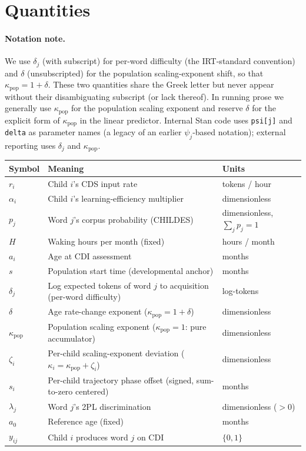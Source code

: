 \documentclass[11pt]{article}
\begin{document}
\section{Quantities}

\paragraph{Notation note.} We use \(\delta_j\) (with subscript) for
per-word difficulty (the IRT-standard convention) and \(\delta\)
(unsubscripted) for the population scaling-exponent shift, so that
\(\kappa_{\text{pop}} = 1 + \delta\). These two quantities share the
Greek letter but never appear without their disambiguating subscript
(or lack thereof). In running prose we generally use
\(\kappa_{\text{pop}}\) for the population scaling exponent and reserve
\(\delta\) for the explicit form of \(\kappa_{\text{pop}}\) in the
linear predictor. Internal Stan code uses \texttt{psi[j]} and
\texttt{delta} as parameter names (a legacy of an earlier
\(\psi_j\)-based notation); external reporting uses \(\delta_j\) and
\(\kappa_{\text{pop}}\).

\begin{center}
\small
\begin{tabular}{@{}lll@{}}
\toprule
Symbol & Meaning & Units \\
\midrule
\(r_i\)         & Child \(i\)'s CDS input rate                & tokens / hour \\
\(\alpha_i\)    & Child \(i\)'s learning-efficiency multiplier & dimensionless \\
\(p_j\)         & Word \(j\)'s corpus probability (CHILDES)   & dimensionless, \(\sum_j p_j = 1\) \\
\(H\)           & Waking hours per month (fixed)              & hours / month \\
\(a_i\)         & Age at CDI assessment                       & months \\
\(s\)           & Population start time (developmental anchor) & months \\
\(\delta_j\)    & Log expected tokens of word \(j\) to acquisition (per-word difficulty) & log-tokens \\
\(\delta\)      & Age rate-change exponent (\(\kappa_{\text{pop}} = 1 + \delta\)) & dimensionless \\
\(\kappa_{\text{pop}}\) & Population scaling exponent (\(\kappa_{\text{pop}} = 1\): pure accumulator) & dimensionless \\
\(\zeta_i\)     & Per-child scaling-exponent deviation (\(\kappa_i = \kappa_{\text{pop}} + \zeta_i\)) & dimensionless \\
\(s_i\)         & Per-child trajectory phase offset (signed, sum-to-zero centered) & months \\
\(\lambda_j\)   & Word \(j\)'s 2PL discrimination             & dimensionless ($>0$) \\
\(a_0\)         & Reference age (fixed)                       & months \\
\(y_{ij}\)      & Child \(i\) produces word \(j\) on CDI      & \(\{0, 1\}\) \\
\bottomrule
\end{tabular}
\end{center}
\end{document}
